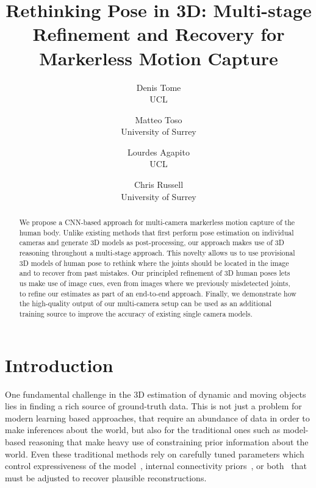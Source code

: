 \documentclass[10pt,twocolumn,letterpaper]{article}
\begin{document}
\title{Rethinking Pose in 3D: Multi-stage Refinement and Recovery for Markerless Motion Capture}





\author{Denis Tome\\
UCL\\
\and
Matteo Toso\\
University of Surrey\\
\and
Lourdes Agapito\\
UCL
\and
Chris Russell\\
University of Surrey
}

\maketitle
\thispagestyle{empty}
\begin{abstract}
We propose a CNN-based approach for multi-camera markerless motion capture of
 the human body. Unlike existing methods that first perform pose estimation
 on individual cameras and generate 3D models as post-processing, our approach makes use of 3D reasoning throughout a multi-stage approach.
This novelty
 allows us to use provisional 3D models of human pose to rethink where the joints
 should be located in the image and to recover from past mistakes. Our
 principled refinement of 3D human poses lets us make use of image cues, even
 from images where we previously misdetected joints, to refine our estimates
 as part of an end-to-end approach. Finally, we demonstrate how the high-quality output
 of our multi-camera setup can be used as an additional training source to
 improve the accuracy of existing single camera models.
\end{abstract}


\section{Introduction}

One fundamental challenge in the 3D estimation of dynamic and moving objects
lies in finding a rich source of ground-truth data. This is not just a problem
for modern learning based approaches, that require an abundance of data in order
to make inferences about the world, but also for the traditional ones such
as model-based reasoning that make heavy use of constraining prior
information about the world. Even these traditional methods rely on carefully
tuned parameters which control expressiveness of the model~\cite{bregler2000recovering}, internal connectivity
priors~\cite{russell2014video}, or both~\cite{garg2013dense} that must be
adjusted to recover plausible reconstructions.
\end{document}

